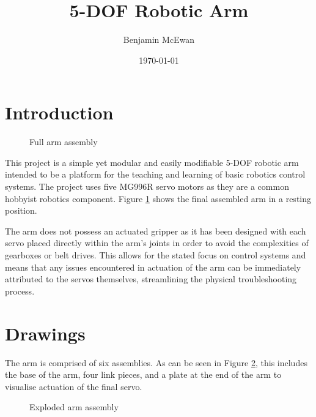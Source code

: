 \documentclass[a4paper,11pt]{article}
\begin{document}
\title{\textbf{5-DOF Robotic Arm}}
\author{Benjamin McEwan}
\date{\today}
\maketitle

\tableofcontents
\newpage


\section{Introduction}
\begin{figure}[h!]
    \centering
     
    \caption{Full arm assembly}
    \label{fig:arm}
\end{figure}

This project is a simple yet modular and easily modifiable 5-DOF robotic arm intended to be a platform for the teaching and learning of basic robotics control systems. The project uses five MG996R servo motors as they are a common hobbyist robotics component. Figure \ref{fig:arm} shows the final assembled arm in a resting position.

The arm does not possess an actuated gripper as it has been designed with each servo placed directly within the arm's joints in order to avoid the complexities of gearboxes or belt drives. This allows for the stated focus on control systems and means that any issues encountered in actuation of the arm can be immediately attributed to the servos themselves, streamlining the physical troubleshooting process.


\section{Drawings}
The arm is comprised of six assemblies. As can be seen in Figure \ref{fig:assembly}, this includes the base of the arm, four link pieces, and a plate at the end of the arm to visualise actuation of the final servo.

\begin{figure}[h!]
    \centering
    
    \caption{Exploded arm assembly}
    \label{fig:assembly}
\end{figure}
\end{document}
